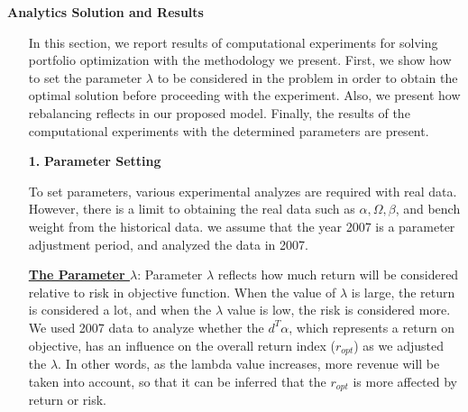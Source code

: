 \documentclass[11pt]{article}
\begin{document}
\textbf{Analytics Solution and Results}
\begin{itemize}
\item[] In this section, we report results of computational experiments for solving portfolio optimization with the methodology we present. First, we show how to set the parameter $\lambda$ to be considered in the problem in order to obtain the optimal solution before proceeding with the experiment. Also, we present how rebalancing reflects in our proposed model. Finally, the results of the computational experiments with the determined parameters are present.

	\item[\textbf{1.}] \textbf{Parameter Setting}
	\item[]To set parameters, various experimental analyzes are required with real data. However, there is a limit to obtaining the real data such as $\alpha, \Omega, \beta$, and bench weight from the historical data. we assume that the year 2007 is a parameter adjustment period, and analyzed the data in 2007. 
	
	\item[] \underline{\textbf{The Parameter $\lambda$}}: Parameter $ \lambda $ reflects how much return will be considered relative to risk in objective function. When the value of $ \lambda $ is large, the return is considered a lot, and when the $ \lambda $ value is low, the risk is considered more. We used 2007 data to analyze whether the $d^{T} \alpha$, which represents a return on objective, has an influence on the overall return index ($r_{opt}$) as we adjusted the $\lambda$. In other words, as the lambda value increases, more revenue will be taken into account, so that it can be inferred that the $r_{opt}$  is more affected by return or risk.
	

\end{itemize}
\end{document}
